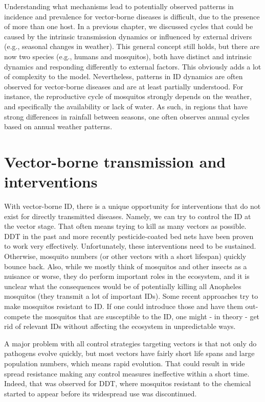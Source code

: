 \documentclass[]{book}
\theoremstyle{definition}
\theoremstyle{definition}
\theoremstyle{definition}
\theoremstyle{remark}
\begin{document}
Understanding what mechanisms lead to potentially observed patterns in
incidence and prevalence for vector-borne diseases is difficult, due to
the presence of more than one host. In a previous chapter, we discussed
cycles that could be caused by the intrinsic transmission dynamics or
influenced by external drivers (e.g., seasonal changes in weather). This
general concept still holds, but there are now two species (e.g., humans
and mosquitos), both have distinct and intrinsic dynamics and responding
differently to external factors. This obviously adds a lot of complexity
to the model. Nevertheless, patterns in ID dynamics are often observed
for vector-borne diseases and are at least partially understood. For
instance, the reproductive cycle of mosquitos strongly depends on the
weather, and specifically the availability or lack of water. As such, in
regions that have strong differences in rainfall between seasons, one
often observes annual cycles based on annual weather patterns.

\hypertarget{vector-borne-transmission-and-interventions}{%
\section{Vector-borne transmission and
interventions}\label{vector-borne-transmission-and-interventions}}

With vector-borne ID, there is a unique opportunity for interventions
that do not exist for directly transmitted diseases. Namely, we can try
to control the ID at the vector stage. That often means trying to kill
as many vectors as possible. DDT in the past and more recently
pesticide-coated bed nets have been proven to work very effectively.
Unfortunately, these interventions need to be sustained. Otherwise,
mosquito numbers (or other vectors with a short lifespan) quickly bounce
back. Also, while we mostly think of mosquitos and other insects as a
nuisance or worse, they do perform important roles in the ecosystem, and
it is unclear what the consequences would be of potentially killing all
Anopheles mosquitos (they transmit a lot of important IDs). Some recent
approaches try to make mosquitos resistant to ID. If one could introduce
those and have them out-compete the mosquitos that are susceptible to
the ID, one might - in theory - get rid of relevant IDs without
affecting the ecosystem in unpredictable ways.

A major problem with all control strategies targeting vectors is that
not only do pathogens evolve quickly, but most vectors have fairly short
life spans and large population numbers, which means rapid evolution.
That could result in wide spread resistance making any control measures
ineffective within a short time. Indeed, that was observed for DDT,
where mosquitos resistant to the chemical started to appear before its
widespread use was discontinued.
\end{document}
